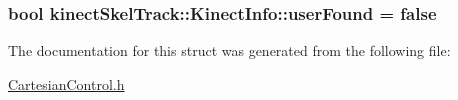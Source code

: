 \subsubsection[{\texorpdfstring{user\+Found}{userFound}}]{\setlength{\rightskip}{0pt plus 5cm}bool kinect\+Skel\+Track\+::\+Kinect\+Info\+::user\+Found = false}\hypertarget{structkinectSkelTrack_1_1KinectInfo_a772bf02b53092fd2424849292b2c3c1d}{}\label{structkinectSkelTrack_1_1KinectInfo_a772bf02b53092fd2424849292b2c3c1d}


The documentation for this struct was generated from the following file\+:\begin{DoxyCompactItemize}
\item 
\hyperlink{CartesianControl_8h}{Cartesian\+Control.\+h}\end{DoxyCompactItemize}
